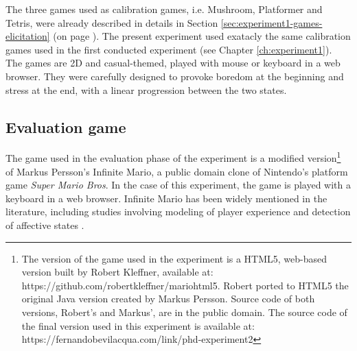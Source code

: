The three games used as calibration games, i.e. Mushroom, Platformer and Tetris, were already described in details in Section \ref{sec:experiment1-games-elicitation} (on page \pageref{sec:experiment1-games-elicitation}). The present experiment used exatacly the same calibration games used in the first conducted experiment (see Chapter \ref{ch:experiment1}). The games are 2D and casual-themed, played with mouse or keyboard in a web browser. They were carefully designed to provoke boredom at the beginning and stress at the end, with a linear progression between the two states.

\subsection{Evaluation game}
\label{sec:experiment2-evaluation-game}





The game used in the evaluation phase of the experiment is a modified version\footnote{The version of the game used in the experiment is a HTML5, web-based version built by Robert Kleffner, available at: https://github.com/robertkleffner/mariohtml5. Robert ported to HTML5 the original Java version created by Markus Persson. Source code of both versions, Robert's and Markus', are in the public domain. The source code of the final version used in this experiment is available at: https://fernandobevilacqua.com/link/phd-experiment2} of Markus Persson's Infinite Mario, a public domain clone of Nintendo's platform game \textit{Super Mario Bros}. In the case of this experiment, the game is played with a keyboard in a web browser. Infinite Mario has been widely mentioned in the literature, including studies involving modeling of player experience \parencite{pedersen2009modeling,pedersen2010modeling,shaker2011game} and detection of affective states \parencite{shaker2011feature}.

